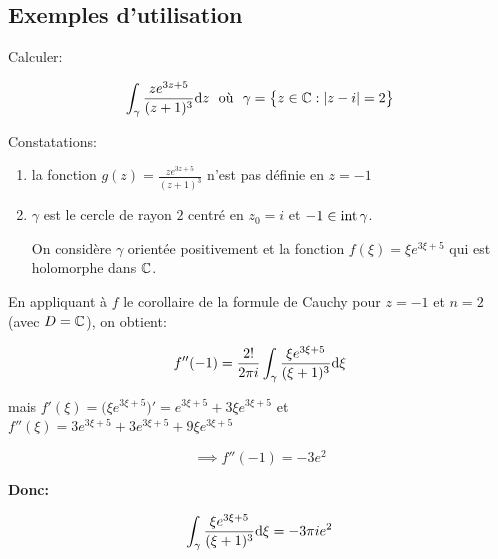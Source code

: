 \subsection{Exemples d'utilisation}

\begin{example}[1]
    Calculer:
    
    \[
    \int_\gamma \frac{z e^{3z + 5}}{(z + 1)^3}\mathrm{d}z \ \textrm{ où }\ \gamma = \big\{z \in \mathbb{C} : \left|z - i\right| = 2\big\}
    \]
    
    Constatations:
    
    \begin{enumerate}[label=\arabic{enumi})]
    \item 
    la fonction $g(z) = \frac{z e^{3z + 5}}{(z + 1)^3}$ n'est pas définie en $z = -1$
    
    \item 
    $\gamma$ est le cercle de rayon $2$ centré en $z_0 = i$ et $-1 \in \textrm{int}\, \gamma$.
    
    On considère $\gamma$ orientée positivement et la fonction $f(\xi) = \xi e^{3\xi + 5}$ qui est holomorphe dans $\mathbb{C}$.
    \end{enumerate}

    En appliquant à $f$ le corollaire de la formule de Cauchy pour $z = -1$ et $n = 2$ (avec $D = \mathbb{C}$), on obtient:
    
    \[f''(-1) = \frac{2!}{2\pi i} \int_\gamma \frac{\xi e^{3\xi + 5}}{(\xi + 1)^3} \mathrm{d}\xi\]
    
    mais $f'(\xi) = \big(\xi e^{3\xi + 5}\big)' = e^{3\xi + 5} + 3 \xi e^{3\xi + 5}$ et $f''(\xi) = 3 e^{3\xi + 5} + 3 e^{3\xi + 5} + 9 \xi e^{3\xi + 5}$
    
    \[ \implies f''(-1) = -3 e^2 \]
    
    \textbf{Donc:}
    
    \[
    \int_\gamma \frac{\xi e^{3\xi + 5}}{(\xi + 1)^3} \mathrm{d}\xi
    = -3\pi i e^2
    \]
\end{example}


